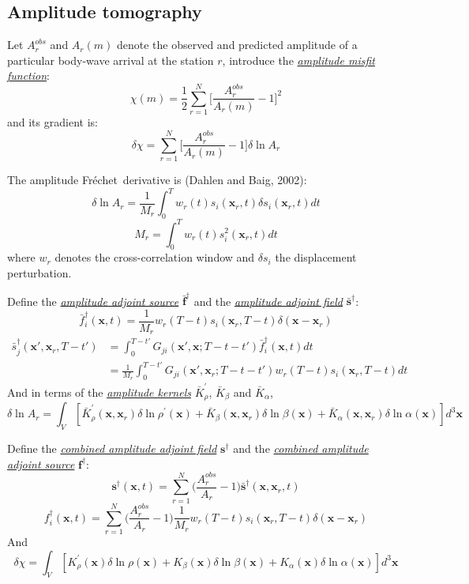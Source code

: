 \documentclass{article}
\newcommand{\mbf}[1]{\mathbf{#1}}
\newcommand{\mynem}[1]{\textsl{\uline{#1}}}
\newcommand{\myno}[1]{{\color{blue}#1}}
\newcommand{\Frechet}{Fr\'{e}chet~}
\begin{document}
\subsection{Amplitude tomography}
Let $A_r^{obs}$ and $A_r(m)$ denote the observed and predicted amplitude of a particular body-wave arrival at the station $r$, introduce the \mynem{amplitude misfit function}:
\[ \chi(m)=\frac{1}{2}\sum_{r=1}^N\Big[\frac{A_r^{obs}}{A_r(m)}-1\Big]^2 \]
and its gradient is:
\[ \delta\chi=\sum_{r=1}^N\Big[\frac{A_r^{obs}}{A_r(m)}-1\Big]\delta\ln A_r \]\par
The \myno{amplitude \Frechet derivative} is (Dahlen and Baig, 2002):
\[ \delta\ln A_r=\frac{1}{M_r}\int_0^Tw_r(t)s_i(\mbf x_r,t)\delta s_i(\mbf x_r,t)dt \]
\[ M_r=\int_0^Tw_r(t)s_i^2(\mbf x_r,t)dt \]
where $w_r$ denotes the cross-correlation window and $\delta s_i$ the displacement perturbation.\par
Define the \mynem{amplitude adjoint source} $\bar{\mbf f}^\dagger$ and the \mynem{amplitude adjoint field} $\bar{\mbf s}^\dagger$:
\[ \bar f_i^\dagger(\mbf x,t)=\frac{1}{M_r}w_r(T-t)s_i(\mbf x_r,T-t)\delta(\mbf x-\mbf x_r) \]
\begin{align*}
  \bar s_j^\dagger(\mbf x',\mbf x_r,T-t') & =\int_0^{T-t'}G_{ji}(\mbf x',\mbf x;T-t-t')\bar f_i^\dagger(\mbf x,t) dt \\
    & =\frac{1}{M_r}\int_0^{T-t'}G_{ji}(\mbf x',\mbf x_r;T-t-t')w_r(T-t)s_i(\mbf x_r,T-t)dt
\end{align*}
And in terms of the \mynem{amplitude kernels} $\bar K_\rho^\prime$, $\bar K_\beta$ and $\bar K_\alpha$,
\[ \delta\ln A_r=\int_V[\bar K_\rho^\prime(\mbf x,\mbf x_r)\delta\ln\rho^\prime(\mbf x)+\bar K_\beta(\mbf x,\mbf x_r)\delta\ln\beta(\mbf x)+\bar K_\alpha(\mbf x,\mbf x_r)\delta\ln\alpha(\mbf x)]d^3\mbf x \]\par
Define the \mynem{combined amplitude adjoint field} $\mbf s^\dagger$ and the \mynem{combined amplitude adjoint source} $\mbf f^\dagger$:
\[ \mbf s^\dagger(\mbf x,t)=\sum_{r=1}^N\Big(\frac{A_r^{obs}}{A_r}-1\Big)\bar{\mbf s}^\dagger(\mbf x,\mbf x_r,t) \]
\[ f_i^\dagger(\mbf x,t)=\sum_{r=1}^N\Big(\frac{A_r^{obs}}{A_r}-1\Big)\frac{1}{M_r}w_r(T-t)s_i(\mbf x_r,T-t)\delta(\mbf x-\mbf x_r) \]
And
\[ \delta\chi=\int_V[K_\rho^\prime(\mbf x)\delta\ln\rho(\mbf x)+K_\beta(\mbf x)\delta\ln\beta(\mbf x)+K_\alpha(\mbf x)\delta\ln\alpha(\mbf x)]d^3\mbf x \]\par
\end{document}
